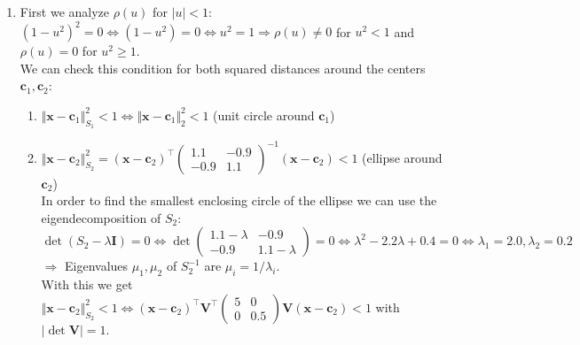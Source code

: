 \documentclass[a4paper]{article}
\makeatletter
\newcommand{\hlnum}[1]{\textcolor[rgb]{0.686,0.059,0.569}{#1}}%
\newcommand{\hlopt}[1]{\textcolor[rgb]{0,0,0}{#1}}%
\newcommand{\hlstd}[1]{\textcolor[rgb]{0.345,0.345,0.345}{#1}}%
\newcommand{\hlkwb}[1]{\textcolor[rgb]{0.69,0.353,0.396}{#1}}%
\newcommand{\hlkwc}[1]{\textcolor[rgb]{0.333,0.667,0.333}{#1}}%
\newcommand{\hlkwd}[1]{\textcolor[rgb]{0.737,0.353,0.396}{\textbf{#1}}}%
\newenvironment{kframe}{%
 \def\at@end@of@kframe{}%
 \ifinner\ifhmode%
  \def\at@end@of@kframe{\end{minipage}}%
  \begin{minipage}{\columnwidth}%
 \fi\fi%
 \def\FrameCommand##1{\hskip\@totalleftmargin \hskip-\fboxsep
 \colorbox{shadecolor}{##1}\hskip-\fboxsep
     \hskip-\linewidth \hskip-\@totalleftmargin \hskip\columnwidth}%
 \MakeFramed {\advance\hsize-\width
   \@totalleftmargin\z@ \linewidth\hsize
   \@setminipage}}%
 {\par\unskip\endMakeFramed%
 \at@end@of@kframe}
\newenvironment{knitrout}{}{} %
\makeatother
\begin{document}
{\begin{enumerate}
\begin{knitrout}
\begin{kframe}
\begin{alltt}
\hlstd{cont_plot} \hlkwb{=} \hlkwd{ggplot}\hlstd{()} \hlopt{+}
    \hlkwd{geom_contour_filled}\hlstd{(}\hlkwc{data} \hlstd{= df,} \hlkwd{aes}\hlstd{(}\hlkwc{x} \hlstd{= xx.X1,} \hlkwc{y} \hlstd{= xx.X2,} \hlkwc{z} \hlstd{= fxx),}
                        \hlkwc{binwidth} \hlstd{=} \hlnum{0.05}\hlstd{)} \hlopt{+}
  \hlkwd{xlab}\hlstd{(}\hlkwd{expression}\hlstd{(x[}\hlnum{1}\hlstd{]))} \hlopt{+}
  \hlkwd{ylab}\hlstd{(}\hlkwd{expression}\hlstd{(x[}\hlnum{2}\hlstd{]))}
\hlstd{cont_plot}
\end{alltt}
\end{kframe}
\texttt{[image: figure/mv-plot\_r\_emp-1]} 
\end{knitrout}
\item 
First we analyze $\rho(u)$ for $\vert u \vert <1:$
$(1-u^2)^2 = 0 \iff (1-u^2) = 0 \iff u^2 = 1 \Rightarrow \rho(u) \neq 0$ for $u^2 < 1$ and $\rho(u) = 0$ for $u^2 \geq 1$.\\
We can check this condition for both squared distances around the centers $\mathbf{c}_1, \mathbf{c}_2$: \\
\begin{enumerate}
\item $\Vert\mathbf{x} - \mathbf{c}_1\Vert_{S_1}^2 < 1 \iff \Vert\mathbf{x} - \mathbf{c}_1\Vert_2^2 < 1$ (unit circle around $\mathbf{c}_1$)
\item $\Vert\mathbf{x} - \mathbf{c}_2\Vert_{S_2}^2 = (\mathbf{x} - \mathbf{c}_2)^\top \begin{pmatrix} 1.1 & -0.9 \\ -0.9 & 1.1\end{pmatrix}^{-1} (\mathbf{x} - \mathbf{c}_2) < 1$ (ellipse around $\mathbf{c}_2$)\\
In order to find the smallest enclosing circle of the ellipse we can use the eigendecomposition of $S_2:$ 
$\det(S_2 - \lambda \mathbf{I}) = 0 \iff  \det \begin{pmatrix} 1.1 - \lambda & -0.9 \\ -0.9 & 1.1 -\lambda\end{pmatrix} = 0 \iff \lambda^2 - 2.2\lambda + 0.4 = 0 \iff \lambda_1 = 2.0, \lambda_2 = 0.2$ \\
$\Rightarrow $ Eigenvalues $\mu_1, \mu_2$ of $S_2^{-1}$ are $\mu_i = 1/\lambda_i.$ \\
With this we get \\
$\Vert\mathbf{x} - \mathbf{c}_2\Vert_{S_2}^2 < 1 \iff  (\mathbf{x} - \mathbf{c}_2)^\top \mathbf{V}^\top \begin{pmatrix} 5 & 0 \\ 0 & 0.5\end{pmatrix}\mathbf{V} (\mathbf{x} - \mathbf{c}_2) < 1$ with $\vert\det\mathbf{V}\vert = 1.$ \\

\end{enumerate}
\end{enumerate}}
\end{document}
